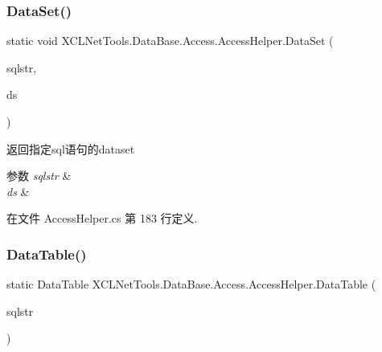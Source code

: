 \subsubsection{\texorpdfstring{Data\+Set()}{DataSet()}\hspace{0.1cm}{\footnotesize\ttfamily [2/2]}}
{\footnotesize\ttfamily static void X\+C\+L\+Net\+Tools.\+Data\+Base.\+Access.\+Access\+Helper.\+Data\+Set (\begin{DoxyParamCaption}\item[{string}]{sqlstr,  }\item[{ref Data\+Set}]{ds }\end{DoxyParamCaption})\hspace{0.3cm}{\ttfamily [static]}}



返回指定sql语句的dataset 


\begin{DoxyParams}{参数}
{\em sqlstr} & \\
\hline
{\em ds} & \\
\hline
\end{DoxyParams}


在文件 Access\+Helper.\+cs 第 183 行定义.

\mbox{\label{class_x_c_l_net_tools_1_1_data_base_1_1_access_1_1_access_helper_aec0d16c3a29668e1298500b0f87d0f6e}} 
\subsubsection{\texorpdfstring{Data\+Table()}{DataTable()}\hspace{0.1cm}{\footnotesize\ttfamily [1/2]}}
{\footnotesize\ttfamily static Data\+Table X\+C\+L\+Net\+Tools.\+Data\+Base.\+Access.\+Access\+Helper.\+Data\+Table (\begin{DoxyParamCaption}\item[{string}]{sqlstr }\end{DoxyParamCaption})\hspace{0.3cm}{\ttfamily [static]}}



